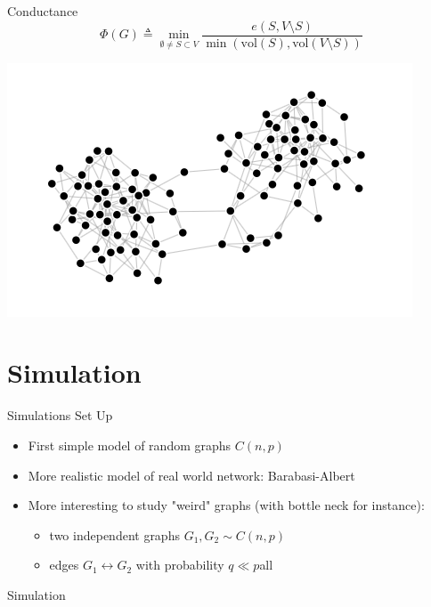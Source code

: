\documentclass{beamer}
\begin{document}
\begin{frame}{Conductance}
      \[
        \Phi(G) \triangleq \min_{\emptyset \not = S \subset V} \frac{e(S, V \setminus S)}{\min(\text{vol}(S), \text{vol}(V \setminus S))}
      \]
      \begin{center}
        
  \includegraphics[width=.9\linewidth]{graph}
      \end{center}
\end{frame}


\section{Simulation}

\frame{\sectionpage}

\begin{frame}{Simulations Set Up}
\begin{itemize}
  \item 
    First simple model of random graphs $C(n,p)$

  \item
    More realistic model of real world network: Barabasi-Albert
  \item More interesting to study "weird" graphs (with bottle neck for instance): 
  \begin{itemize}
    \item two independent graphs $G_1, G_2 \sim C(n,p)$
    \item edges $G_1 \leftrightarrow G_2$ with probability $q \ll p$all
  \end{itemize}
\end{itemize}

\end{frame}

\begin{frame}{Simulation}
  
\end{frame}
\end{document}
